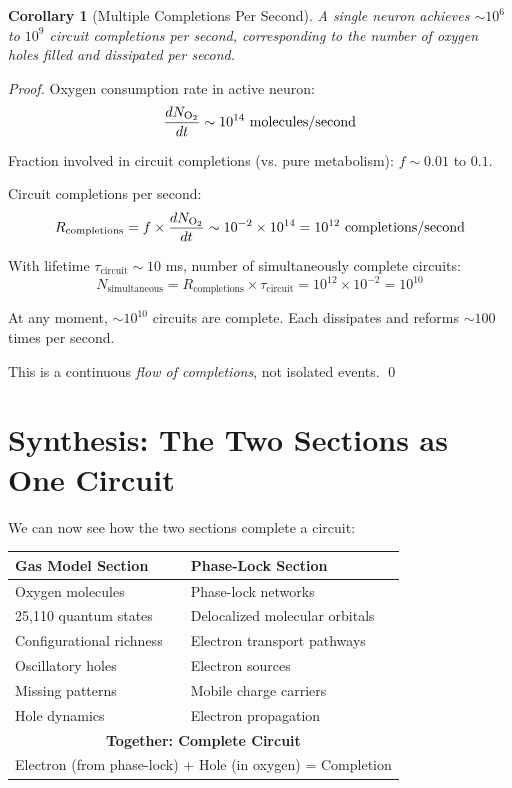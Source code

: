 \documentclass[11pt]{article}
\newtheorem{corollary}[theorem]{Corollary}
\theoremstyle{remark}
\begin{document}
\begin{corollary}[Multiple Completions Per Second]
\label{cor:multiple_completions}
A single neuron achieves $\sim 10^6$ to $10^9$ circuit completions per second, corresponding to the number of oxygen holes filled and dissipated per second.
\end{corollary}

\begin{proof}
Oxygen consumption rate in active neuron:
\begin{equation}
\frac{dN_{\ce{O2}}}{dt} \sim 10^{14} \text{ molecules/second}
\end{equation}

Fraction involved in circuit completions (vs. pure metabolism): $f \sim 0.01$ to $0.1$.

Circuit completions per second:
\begin{equation}
R_{\text{completions}} = f \times \frac{dN_{\ce{O2}}}{dt} \sim 10^{-2} \times 10^{14} = 10^{12} \text{ completions/second}
\end{equation}

With lifetime $\tau_{\text{circuit}} \sim 10$ ms, number of simultaneously complete circuits:
\begin{equation}
N_{\text{simultaneous}} = R_{\text{completions}} \times \tau_{\text{circuit}} = 10^{12} \times 10^{-2} = 10^{10}
\end{equation}

At any moment, $\sim 10^{10}$ circuits are complete. Each dissipates and reforms $\sim 100$ times per second.

This is a continuous \textit{flow of completions}, not isolated events. \qed
\end{proof}

\section{Synthesis: The Two Sections as One Circuit}

We can now see how the two sections complete a circuit:

\begin{center}
\begin{tabular}{ll}
\toprule
\textbf{Gas Model Section} & \textbf{Phase-Lock Section} \\
\midrule
Oxygen molecules & Phase-lock networks \\
25,110 quantum states & Delocalized molecular orbitals \\
Configurational richness & Electron transport pathways \\
Oscillatory holes & Electron sources \\
Missing patterns & Mobile charge carriers \\
Hole dynamics & Electron propagation \\
\midrule
\multicolumn{2}{c}{\textbf{Together: Complete Circuit}} \\
\multicolumn{2}{c}{Electron (from phase-lock) + Hole (in oxygen) = Completion} \\
\bottomrule
\end{tabular}
\end{center}
\end{document}
